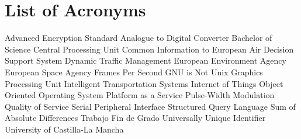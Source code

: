 \chapter{List of Acronyms}

{\small
\begin{acronym}[XXXXXXXX]
			{Advanced Encryption Standard}
			{Analogue to Digital Converter}
			{Bachelor of Science}
			{Central Processing Unit}
		{Common Information to European Air}
			{Decision Support System}
			{Dynamic Traffic Management}
			{European Environment Agency}
			{European Space Agency}
			{Frames Per Second}
	     	{\acs{GNU} is Not Unix}
			{Graphics Processing Unit}
			{Intelligent Transportation Systems}
	 		{Internet of Things}
			{Object Oriented}
			{Operating System}
			{Platform as a Service}
			{Pulse-Width Modulation}
			{Quality of Service}
			{Serial Peripheral Interface}
			{Structured Query Language}
			{Sum of Absolute Differences}
			{Trabajo Fin de Grado}
			{Universally Unique Identifier}
			{University of Castilla-La Mancha}
\end{acronym}
}




